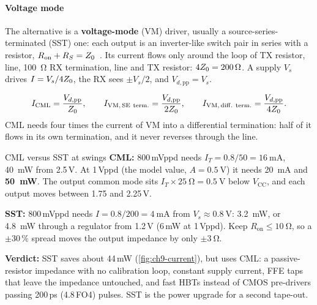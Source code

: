 \paragraph{Voltage mode} The alternative is a \textbf{voltage-mode} (VM) driver, usually a source-series-terminated (SST) one: each output is an inverter-like switch pair in series with a resistor, $R_\mathrm{on}+R_S=Z_0$~\cite{p4:wong2004}. Its current flows only around the loop of TX resistor, line, \qty{100}{\ohm} RX termination, line and TX resistor: $4Z_0=\qty{200}{\ohm}$. A supply $V_s$ drives $I=V_s/4Z_0$, the RX sees $\pm V_s/2$, and $V_{d,\mathrm{pp}}=V_s$.

\begin{keyeq}
\begin{equation}
  I_\mathrm{CML}=\frac{V_{d,\mathrm{pp}}}{Z_0},\qquad
  I_\mathrm{VM,\,SE\ term.}=\frac{V_{d,\mathrm{pp}}}{2Z_0},\qquad
  I_\mathrm{VM,\,diff.\ term.}=\frac{V_{d,\mathrm{pp}}}{4Z_0}.
  \label{eq:ch9-drv}
\end{equation}
CML needs four times the current of VM into a differential termination: half of it flows in its own termination, and it never reverses through the line.
\end{keyeq}

\begin{example}{CML versus SST at \OS{} swings}\label{we:ch9-drv}
\textbf{CML:} 800\,mVppd needs $I_T=0.8/50=\qty{16}{\milli\ampere}$, \qty{40}{\milli\watt} from 2.5\,V. At 1\,Vppd (the model value, $A=\qty{0.5}{\volt}$) it needs \qty{20}{\milli\ampere} and \textbf{\qty{50}{\milli\watt}}. The output common mode sits $I_T\times\qty{25}{\ohm}=\qty{0.5}{\volt}$ below $V_\mathrm{CC}$, and each output moves between 1.75 and 2.25\,V.

\textbf{SST:} 800\,mVppd needs $I=0.8/200=\qty{4}{\milli\ampere}$ from $V_s\approx\qty{0.8}{\volt}$: \qty{3.2}{\milli\watt}, or \qty{4.8}{\milli\watt} through a regulator from 1.2\,V (6\,mW at 1\,Vppd). Keep $R_\mathrm{on}\le\qty{10}{\ohm}$, so a $\pm30\,\%$ spread moves the output impedance by only $\pm\qty{3}{\ohm}$.

\textbf{Verdict:} SST saves about 44\,mW (\cref{fig:ch9-current}), but \OS{} uses CML: a passive-resistor impedance with no calibration loop, constant supply current, FFE taps that leave the impedance untouched, and fast HBTs instead of CMOS pre-drivers passing 200\,ps (4.8\,FO4) pulses. SST is the power upgrade for a second tape-out.
\end{example}

